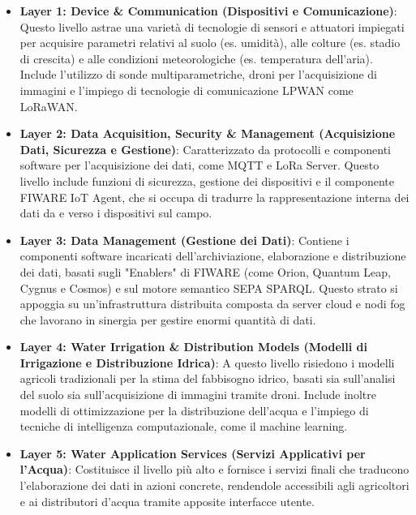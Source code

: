 \begin{itemize}
	\item \textbf{Layer 1: Device \& Communication (Dispositivi e Comunicazione)}: Questo livello astrae una varietà di tecnologie di sensori e attuatori impiegati per acquisire parametri relativi al suolo (es. umidità), alle colture (es. stadio di crescita) e alle condizioni meteorologiche (es. temperatura dell'aria). Include l'utilizzo di sonde multiparametriche, droni per l'acquisizione di immagini e l'impiego di tecnologie di comunicazione LPWAN come LoRaWAN.
	

	\item \textbf{Layer 2: Data Acquisition, Security \& Management (Acquisizione Dati, Sicurezza e Gestione)}: Caratterizzato da protocolli e componenti software per l'acquisizione dei dati, come MQTT e LoRa Server. Questo livello include funzioni di sicurezza, gestione dei dispositivi e il componente FIWARE IoT Agent, che si occupa di tradurre la rappresentazione interna dei dati da e verso i dispositivi sul campo.
	
	\item \textbf{Layer 3: Data Management (Gestione dei Dati)}: Contiene i componenti software incaricati dell'archiviazione, elaborazione e distribuzione dei dati, basati sugli "Enablers" di FIWARE (come Orion, Quantum Leap, Cygnus e Cosmos) e sul motore semantico SEPA SPARQL. Questo strato si appoggia su un'infrastruttura distribuita composta da server cloud e nodi fog che lavorano in sinergia per gestire enormi quantità di dati.
	
	\item \textbf{Layer 4: Water Irrigation \& Distribution Models (Modelli di Irrigazione e Distribuzione Idrica)}: A questo livello risiedono i modelli agricoli tradizionali per la stima del fabbisogno idrico, basati sia sull'analisi del suolo sia sull'acquisizione di immagini tramite droni. Include inoltre modelli di ottimizzazione per la distribuzione dell'acqua e l'impiego di tecniche di intelligenza computazionale, come il machine learning.
	
	\item \textbf{Layer 5: Water Application Services (Servizi Applicativi per l'Acqua)}: Costituisce il livello più alto e fornisce i servizi finali che traducono l'elaborazione dei dati in azioni concrete, rendendole accessibili agli agricoltori e ai distributori d'acqua tramite apposite interfacce utente.
	
	
\end{itemize}


